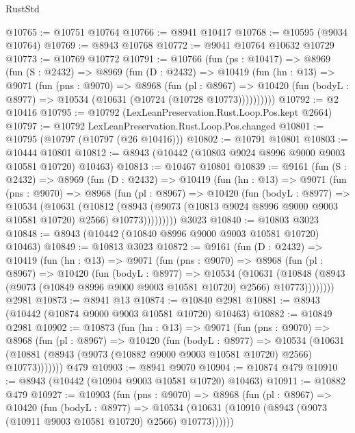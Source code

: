 \begin{lexlean}{RustStd}
\begin{coremodule}
{\begin{coremodule}
{{{{{{{{{{{{{{{{{{{{{{{{{{{{{{{{{{{{{{{@10765 := @10751 @10764
@10766 := @8941 @10417
@10768 := @10595 (@9034 @10764)
@10769 := @8943 @10768
@10772 := @9041 @10764 @10632 @10729
@10773 := @10769 @10772
@10791 := @10766
    (fun (ps : @10417) =>
    @8969
      (fun (S : @2432) =>
      @8969
        (fun (D : @2432) =>
        @10419
          (fun (hn : @13) =>
          @9071
            (fun (pns : @9070) =>
            @8968
              (fun (pl : @8967) =>
              @10420 (fun (bodyL : @8977) => @10534 (@10631 (@10724 (@10728 @10773))))))))))
@10792 := @2 @10416
@10795 := @10792 (LexLeanPreservation.Rust.Loop.Pos.kept @2664)
@10797 := @10792 LexLeanPreservation.Rust.Loop.Pos.changed
@10801 := @10795 (@10797 (@10797 (@26 @10416)))
@10802 := @10791 @10801
@10803 := @10444 @10801
@10812 := @8943 (@10442 (@10803 @9024 @8996 @9000 @9003 @10581 @10720) @10463)
@10813 := @10467 @10801
@10839 := @9161
    (fun (S : @2432) =>
    @8969
      (fun (D : @2432) =>
      @10419
        (fun (hn : @13) =>
        @9071
          (fun (pns : @9070) =>
          @8968
            (fun (pl : @8967) =>
            @10420
              (fun (bodyL : @8977) =>
              @10534
                (@10631
                  (@10812
                    (@8943
                      (@9073 (@10813 @9024 @8996 @9000 @9003 @10581 @10720) @2566)
                      @10773)))))))))
    @3023
@10840 := @10803 @3023
@10848 := @8943 (@10442 (@10840 @8996 @9000 @9003 @10581 @10720) @10463)
@10849 := @10813 @3023
@10872 := @9161
    (fun (D : @2432) =>
    @10419
      (fun (hn : @13) =>
      @9071
        (fun (pns : @9070) =>
        @8968
          (fun (pl : @8967) =>
          @10420
            (fun (bodyL : @8977) =>
            @10534
              (@10631
                (@10848 (@8943 (@9073 (@10849 @8996 @9000 @9003 @10581 @10720) @2566) @10773))))))))
    @2981
@10873 := @8941 @13
@10874 := @10840 @2981
@10881 := @8943 (@10442 (@10874 @9000 @9003 @10581 @10720) @10463)
@10882 := @10849 @2981
@10902 := @10873
    (fun (hn : @13) =>
    @9071
      (fun (pns : @9070) =>
      @8968
        (fun (pl : @8967) =>
        @10420
          (fun (bodyL : @8977) =>
          @10534
            (@10631 (@10881 (@8943 (@9073 (@10882 @9000 @9003 @10581 @10720) @2566) @10773)))))))
    @479
@10903 := @8941 @9070
@10904 := @10874 @479
@10910 := @8943 (@10442 (@10904 @9003 @10581 @10720) @10463)
@10911 := @10882 @479
@10927 := @10903
    (fun (pns : @9070) =>
    @8968
      (fun (pl : @8967) =>
      @10420
        (fun (bodyL : @8977) =>
        @10534 (@10631 (@10910 (@8943 (@9073 (@10911 @9003 @10581 @10720) @2566) @10773))))))
}}}}}}}}}}}}}}}}}}}}}}}}}}}}}}}}}}}}}}}
\end{coremodule}}
\end{coremodule}
\end{lexlean}

